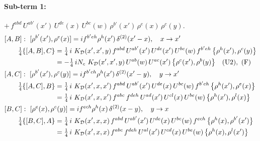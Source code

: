 \documentclass[10pt]{article}
\numberwithin{equation}{section}
\begin{document}
\paragraph{Sub-term 1:} $+\,f^{abd}\,U^{ab'}(x')\,U^{de}(x)\,U^{bc}(w)\,\rho^{b'}(x')\,\rho^{e}(x)\,\rho^{c}(y)$.
\begin{align}
&[A,B]:\ [\rho^{b'}(x'),\rho^{e}(x)]=i f^{b'eh}\rho^{h}(x')\,\delta^{(2)}(x'-x),\quad x\to x'\notag\\
&\qquad \tfrac14\{[A,B],C\}=\tfrac14\,i\,\,K_{\mathcal D}(x',x',y)\,f^{abd}\,U^{ab'}(x')\,U^{de}(x')\,U^{bc}(w)\,f^{b'eh}\,\big\{\rho^{h}(x'),\rho^{c}(y)\big\}\notag\\
&\qquad\phantom{\tfrac14\{[A,B],C\}}=-\tfrac14\,i N_{c}\,\,K_{\mathcal D}(x',x',y)\,U^{ab}(w)\,U^{ac}(x')\,\big\{\rho^{c}(x'),\rho^{b}(y)\big\}\quad\text{(U2)},\ \text{(F)}
\label{T:eq:D-1-AB}\\
&[A,C]:\ [\rho^{b'}(x'),\rho^{c}(y)]=i f^{b'ch}\rho^{h}(x')\,\delta^{(2)}(x'-y),\quad y\to x'\notag\\
&\qquad \tfrac14\{[A,C],B\}=\tfrac14\,i\,\,K_{\mathcal D}(x',x,x')\,f^{abd}\,U^{ab'}(x')\,U^{de}(x)\,U^{bc}(w)\,f^{b'ch}\,\big\{\rho^{h}(x'),\rho^{e}(x)\big\}\notag\\
&\qquad\phantom{\tfrac14\{[A,C],B\}}=\tfrac14\,i\,\,K_{\mathcal D}(x',x,x')\,f^{abc}\,f^{deh}\,U^{ad}(x')\,U^{cl}(x)\,U^{be}(w)\,\big\{\rho^{h}(x'),\rho^{l}(x)\big\}
\label{T:eq:D-1-AC}\\
&[B,C]:\ [\rho^{e}(x),\rho^{c}(y)]=i f^{ech}\rho^{h}(x)\,\delta^{(2)}(x-y),\quad y\to x\notag\\
&\qquad \tfrac14\{[B,C],A\}=\tfrac14\,i\,\,K_{\mathcal D}(x',x,x)\,f^{abd}\,U^{ab'}(x')\,U^{de}(x)\,U^{bc}(w)\,f^{ech}\,\big\{\rho^{h}(x),\rho^{b'}(x')\big\}\notag\\
&\qquad\phantom{\tfrac14\{[B,C],A\}}=\tfrac14\,i\,\,K_{\mathcal D}(x',x,x)\,f^{abc}\,f^{deh}\,U^{al}(x')\,U^{cd}(x)\,U^{be}(w)\,\big\{\rho^{h}(x),\rho^{l}(x')\big\}
\label{T:eq:D-1-BC}
\end{align}
\end{document}
